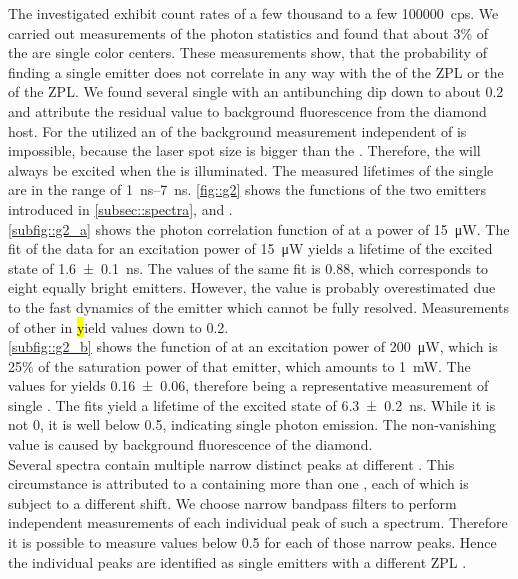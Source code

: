 	The investigated \sivs exhibit count rates of a few thousand to a few \SI{100000}{cps}.
	We carried out measurements of the photon statistics and found that about 3\% of the \sivs are single color centers.
	These measurements show, that the probability of finding a single emitter does not correlate in any way with the \cwl of the ZPL or the \lw of the ZPL.
	We found several single \sivs with an antibunching dip down to about \num{0.2} and attribute the residual \gtz value to background fluorescence from the diamond host.
	For the utilized \nds an of the background measurement independent of \siv \pl is impossible, because the laser spot size is bigger than the \nd. 
	Therefore, the \siv will always be excited when the \nd is illuminated.
	The measured lifetimes of the single \sivs are in the range of \SIrange{1}{7}{ns}.
	\autoref{fig::g2} shows the \gt functions of the two emitters introduced in \autoref{subsec::spectra}, \emnarrow and \embroad.
	\\
	\autoref{subfig::g2_a} shows the photon correlation function of \emnarrow at a power of \SI{15}{\micro\W}. 
	The fit of the data for an excitation power of \SI{15}{\micro\W} yields a lifetime of the excited state of \SI[separate-uncertainty]{1.6\pm0.1}{ns}.
	The \gtz values of the same fit is \num{0.88}, which corresponds to eight equally bright emitters.
	However, the \gtz value is probably overestimated due to the fast dynamics of the emitter which cannot be fully resolved.
	Measurements of other \sivs in \hl yield \gtz values down to \num[separate-uncertainty]{0.2}.
	\\
	\autoref{subfig::g2_b} shows the \gt function of \embroad at an excitation power of \SI{200}{\micro\W}, which is 25\% of the saturation power of that emitter, which amounts to \SI{1}{mW}.
	The \gtz values for yields \num[separate-uncertainty]{0.16\pm0.06}, therefore being a representative \gt measurement of single \sivs.
	The fits yield a lifetime of the excited state of \SI[separate-uncertainty]{6.3\pm0.2}{ns}.
	While it is not 0, it is well below \num{0.5}, indicating single photon emission.
	The non-vanishing \gtz value is caused by background fluorescence of the diamond.
	\\
	Several spectra contain multiple narrow distinct peaks at different \ZPL \cwls.
	This circumstance is attributed to a \nd containing more than one \siv, each of which is subject to a different \cwl shift.
	We choose narrow bandpass filters to perform independent measurements of each individual \siv peak of such a spectrum.
	Therefore it is possible to measure \gtz values below \num{0.5} for each of those narrow peaks.
	Hence the individual peaks are identified as single emitters with a different ZPL \cwl.




